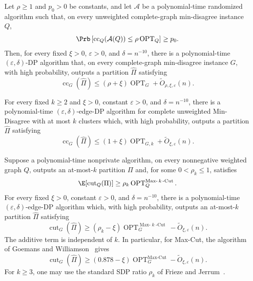 \begin{theorem}
\label{thm:cc-black-box-reduction}
Let $\rho\geq1$ and $p_0>0$ be constants, and let $\mathcal A$ be a polynomial-time randomized algorithm such that, on every unweighted complete-graph min-disagree instance $Q$,
\[
 \Prb\left[\operatorname{cc}_Q(\mathcal A(Q)) \leq \rho\operatorname{OPT}_Q\right] \geq p_0.
\]
Then, for every fixed $\xi>0$, $\varepsilon>0$, and $\delta=n^{-10}$, there is a polynomial-time $(\varepsilon, \delta)$-DP algorithm that, on every complete-graph min-disagree instance $G$, with high probability, outputs a partition $\widehat\Pi$ satisfying
\[
 \operatorname{cc}_G(\widehat\Pi) \leq (\rho+\xi)\operatorname{OPT}_G+\widetilde O_{\rho,\xi,\varepsilon}(n).
\]
\end{theorem}

\begin{corollary}
\label{cor:cc-fixed-k}
For every fixed $k\geq2$ and $\xi>0$, constant $\varepsilon>0$, and $\delta=n^{-10}$, there is a
polynomial-time $(\varepsilon, \delta)$-edge-DP algorithm for complete unweighted
Min-Disagree with at most $k$ clusters which, with high probability, outputs a partition
$\widehat\Pi$ satisfying
\[
 \operatorname{cc}_G(\widehat\Pi)
 \leq (1+\xi)\operatorname{OPT}_{G,k}
   +\widetilde O_{\xi,\varepsilon}(n).
\]
\end{corollary}

\begin{theorem}
\label{thm:private-max-k-cut}
Suppose a polynomial-time nonprivate algorithm, on every nonnegative weighted graph $Q$, outputs
an at-most-$k$ partition $\Pi$ and, for some $0<\rho_k\leq1$, satisfies
\[
 \E[\operatorname{cut}_Q(\Pi)]
 \geq\rho_k\operatorname{OPT}^{\operatorname{Max-}k\operatorname{-Cut}}_Q.
\]
For every fixed $\xi>0$, constant $\varepsilon>0$, and
$\delta=n^{-10}$, there is a polynomial-time $(\varepsilon, \delta)$-edge-DP algorithm which, with
high probability, outputs an at-most-$k$ partition $\widehat\Pi$ satisfying
\[
 \operatorname{cut}_G(\widehat\Pi)
 \geq (\rho_k-\xi)\operatorname{OPT}^{\operatorname{Max-}k\operatorname{-Cut}}_G
   -\widetilde O_{\xi,\varepsilon}(n).
\]
The additive term is independent of $k$.  In particular, for Max-Cut, the algorithm of
Goemans and Williamson~\cite{GoemansWilliamson95} gives
\[
 \operatorname{cut}_G(\widehat\Pi)
 \geq (0.878-\xi)\operatorname{OPT}^{\operatorname{Max-Cut}}_G
   -\widetilde O_{\xi,\varepsilon}(n).
\]
For $k\geq3$, one may use the standard SDP ratio $\rho_k$ of Frieze and
Jerrum~\cite{FriezeJerrum97}.
\end{theorem}

